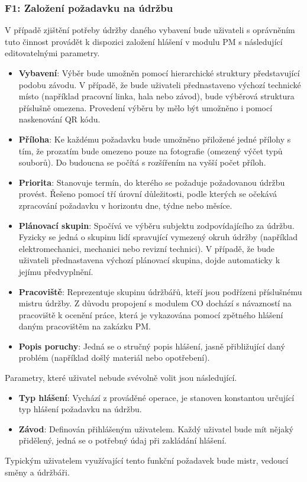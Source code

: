 \documentclass[thesis=M,czech]{FITthesis}[2012/06/26]
\begin{document}
\subsubsection{F1: Založení požadavku na údržbu}
V případě zjištění potřeby údržby daného vybavení bude uživateli s oprávněním tuto činnost provádět k dispozici založení hlášení v modulu PM s následující editovatelnými parametry.
\begin{itemize}
	\item
	\textbf{Vybavení}: Výběr bude umožněn pomocí hierarchické struktury představující podobu závodu. V případě, že bude uživateli přednastaveno výchozí technické místo (například pracovní linka, hala nebo závod), bude výběrová struktura příslušně omezena. Provedení výběru by mělo být umožněno i pomocí naskenování QR kódu.  
	\item
	\textbf{Příloha}: Ke každému požadavku bude umožněno přiložené jedné přílohy s tím, že prozatím bude omezeno pouze na fotografie (omezený výčet typů souborů). Do budoucna se počítá s rozšířením na vyšší počet příloh.  
	\item
	\textbf{Priorita}: Stanovuje termín, do kterého se požaduje požadovanou údržbu provést. Řešeno pomocí tří úrovní důležitosti, podle kterých se očekává zpracování požadavku v horizontu dne, týdne nebo měsíce.
	\item
	\textbf{Plánovací skupin}: Spočívá ve výběru subjektu zodpovídajícího za údržbu. Fyzicky se jedná o skupinu lidí spravující vymezený okruh údržby (například elektromechanici, mechanici nebo revizní technici). V případě, že bude uživateli přednastavena výchozí plánovací skupina, dojde automaticky k jejímu předvyplnění.
	\item
	\textbf{Pracoviště}: Reprezentuje skupinu údržbářů, kteří jsou podřízeni příslušnému mistru údržby. Z důvodu propojení s modulem CO dochází s návazností na pracoviště k ocenění práce, která je vykazována pomocí zpětného hlášení daným pracovištěm na zakázku PM. 
	\item
	\textbf{Popis poruchy}: Jedná se o stručný popis hlášení, jasně přibližující daný problém (například došlý materiál nebo opotřebení). 
\end{itemize} 
Parametry, které uživatel nebude svévolně volit jsou následující.
\begin{itemize}
	\item
	\textbf{Typ hlášení}: Vychází z prováděné operace, je stanoven konstantou určující typ hlášení požadavku na údržbu.
	\item
	\textbf{Závod}: Definován přihlášeným uživatelem. Každý uživatel bude mít nějaký přidělený, jedná se o potřebný údaj při zakládání hlášení.
\end{itemize} 
Typickým uživatelem využívající tento funkční požadavek bude mistr, vedoucí směny a údržbáři.
\end{document}

